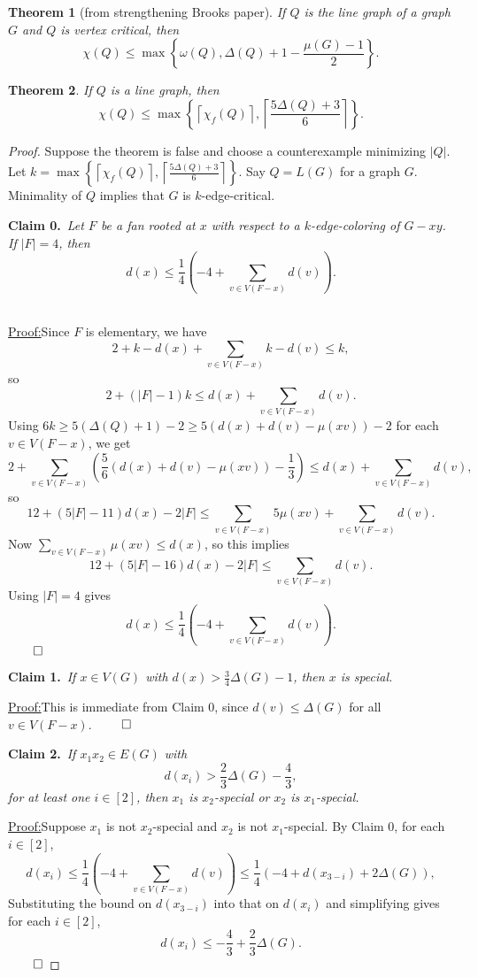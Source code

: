 \documentclass[12pt]{amsart}
\theoremstyle{plain}
\newtheorem{thm}{Theorem}
\theoremstyle{definition}
\theoremstyle{remark}
\newcommand{\set}[1]{\left\{ #1 \right\}}
\newcommand{\card}[1]{\left|#1\right|}
\newcommand{\ceil}[1]{\left\lceil#1\right\rceil}
\newcommand{\irange}[1]{\left[#1\right]}
\newcommand{\parens}[1]{\left( #1 \right)}
\newcommand{\claim}[2]{{\noindent\bf Claim #1.}~{\it #2}~~}
\newenvironment{claimproof}[1]{\par\noindent\underline{Proof:}\space#1}{\leavevmode\unskip\penalty9999
\hbox{}\nobreak\hfill\quad\hbox{$\qed$}}
\begin{document}
\begin{thm}[from strengthening Brooks paper]\label{CriticalMuBound}
If $Q$ is the line graph of a graph $G$ and $Q$ is vertex critical, then
\[\chi(Q) \leq \max\left\{\omega(Q), \Delta(Q) + 1 - \frac{\mu(G) - 1}{2}\right\}.\]
\end{thm}

\begin{thm}
If $Q$ is a line graph, then
\[\chi(Q) \le \max\set{\ceil{\chi_f(Q)}, \ceil{\frac{5\Delta(Q) + 3}{6}}}.\]
\end{thm}
\begin{proof}
Suppose the theorem is false and choose a counterexample minimizing $\card{Q}$.
Let $k = \max\set{\ceil{\chi_f(Q)}, \ceil{\frac{5\Delta(Q) + 3}{6}}}$. Say $Q =
L(G)$ for a graph $G$. Minimality of $Q$ implies that $G$ is $k$-edge-critical.

\claim{0}{Let $F$ be a fan rooted at $x$ with respect to a $k$-edge-coloring of $G - xy$.  If $|F| = 4$, then
\[d(x) \le \frac14\parens{-4 + \sum_{v \in V(F-x)} d(v)}.\]}
\begin{claimproof}
Since $F$ is elementary, we have
\[2 + k-d(x) + \sum_{v \in V(F-x)} k - d(v) \le k,\]
so
\[2 + (|F| - 1)k \le d(x) + \sum_{v \in V(F-x)} d(v).\]
Using $6k \ge 5(\Delta(Q) + 1) - 2 \ge 5(d(x) + d(v) - \mu(xv)) - 2$ for each $v \in V(F-x)$, we get
\[2 + \sum_{v \in V(F-x)}\parens{\frac56(d(x) + d(v) - \mu(xv)) -\frac13} \le d(x) + \sum_{v \in V(F-x)} d(v),\]
so
\[12 + \parens{5|F| - 11}d(x) - 2|F| \le \sum_{v \in V(F-x)} 5\mu(xv) + \sum_{v \in V(F-x)} d(v).\]
Now $\sum_{v \in V(F-x)} \mu(xv) \le d(x)$, so this implies
\[12 + \parens{5|F| - 16}d(x) - 2|F| \le \sum_{v \in V(F-x)} d(v).\]
Using $|F| = 4$ gives
\[d(x) \le \frac14\parens{-4 + \sum_{v \in V(F-x)} d(v)}.\]
\end{claimproof}
\bigskip

\claim{1}{If $x \in V(G)$ with $d(x) > \frac34\Delta(G) - 1$, then $x$ is special.}

\begin{claimproof}
This is immediate from Claim 0, since $d(v)\le \Delta(G)$ for all $v\in V(F-x)$.
\end{claimproof}
\bigskip

\claim{2}{If $x_1x_2 \in E(G)$ with \[d(x_i) > \frac23\Delta(G) -\frac43,\] for at least one $i \in \irange{2}$, then $x_1$ is $x_2$-special or $x_2$ is $x_1$-special.}

\begin{claimproof}
Suppose $x_1$ is not $x_2$-special and $x_2$ is not $x_1$-special.  By Claim 0,
for each $i \in \irange{2}$,
\[d(x_i) \le \frac14\parens{-4 + \sum_{v \in V(F-x)} d(v)} \le \frac14\parens{-4 + d(x_{3-i}) + 2\Delta(G)},\]
Substituting the bound on $d(x_{3-i})$ into that on $d(x_i)$ and simplifying
gives for each $i \in \irange{2}$,
\[d(x_i) \le -\frac43 + \frac23\Delta(G).\]
\end{claimproof}


\end{proof}
\end{document}

